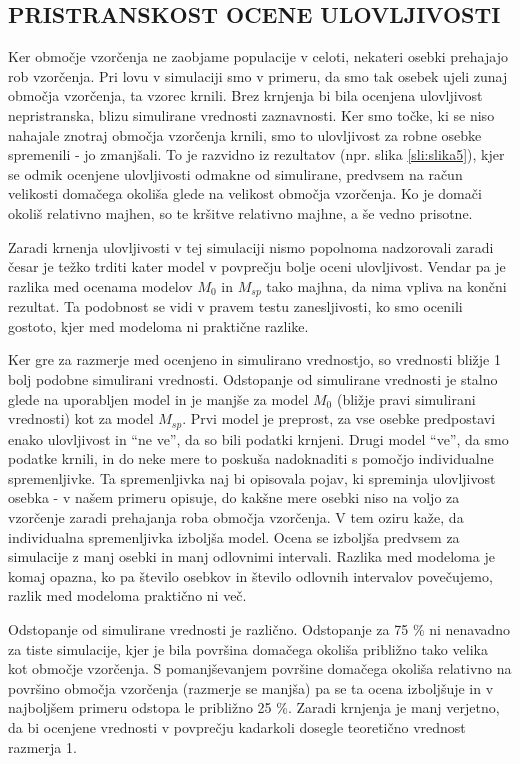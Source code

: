 \subsection{PRISTRANSKOST OCENE ULOVLJIVOSTI}
Ker območje vzorčenja ne zaobjame populacije v celoti, nekateri osebki prehajajo rob vzorčenja. Pri lovu v simulaciji smo v primeru, da smo tak osebek ujeli zunaj območja vzorčenja, ta vzorec krnili. Brez krnjenja bi bila ocenjena ulovljivost nepristranska, blizu simulirane vrednosti zaznavnosti. Ker smo točke, ki se niso nahajale znotraj območja vzorčenja krnili, smo to ulovljivost za robne osebke spremenili - jo zmanjšali. To je razvidno iz rezultatov (npr. slika \ref{sli:slika5}), kjer se odmik ocenjene ulovljivosti odmakne od simulirane, predvsem na račun velikosti domačega okoliša glede na velikost območja vzorčenja. Ko je domači okoliš relativno majhen, so te kršitve relativno majhne, a še vedno prisotne.

Zaradi krnenja ulovljivosti v tej simulaciji nismo popolnoma nadzorovali zaradi česar je težko trditi kater model v povprečju bolje oceni ulovljivost. Vendar pa je razlika med ocenama modelov $M_0$ in $M_{sp}$ tako majhna, da nima vpliva na končni rezultat. Ta podobnost se vidi v pravem testu zanesljivosti, ko smo ocenili gostoto, kjer med modeloma ni praktične razlike.

Ker gre za razmerje med ocenjeno in simulirano vrednostjo, so vrednosti bližje 1 bolj podobne simulirani vrednosti. Odstopanje od simulirane vrednosti je stalno glede na uporabljen model in je manjše za model $M_0$ (bližje pravi simulirani vrednosti) kot za model $M_{sp}$.
Prvi model je preprost, za vse osebke predpostavi enako ulovljivost in ``ne ve'', da so bili podatki krnjeni. Drugi model ``ve'', da smo podatke krnili, in do neke mere to poskuša nadoknaditi s pomočjo individualne spremenljivke. Ta spremenljivka naj bi opisovala pojav, ki spreminja ulovljivost osebka - v našem primeru opisuje, do kakšne mere osebki niso na voljo za vzorčenje zaradi prehajanja roba območja vzorčenja. V tem oziru kaže, da individualna spremenljivka izboljša model. Ocena se izboljša predvsem za simulacije z manj osebki in manj odlovnimi intervali. Razlika med modeloma je komaj opazna, ko pa število osebkov in število odlovnih intervalov povečujemo, razlik med modeloma praktično ni več.

Odstopanje od simulirane vrednosti je različno. Odstopanje za 75 \% ni nenavadno za tiste simulacije, kjer je bila površina domačega okoliša približno tako velika kot območje vzorčenja. S pomanjševanjem površine domačega okoliša relativno na površino območja vzorčenja (razmerje se manjša) pa se ta ocena izboljšuje in v najboljšem primeru odstopa le približno 25 \%. Zaradi krnjenja je manj verjetno, da bi ocenjene vrednosti v povprečju kadarkoli dosegle teoretično vrednost razmerja 1.

